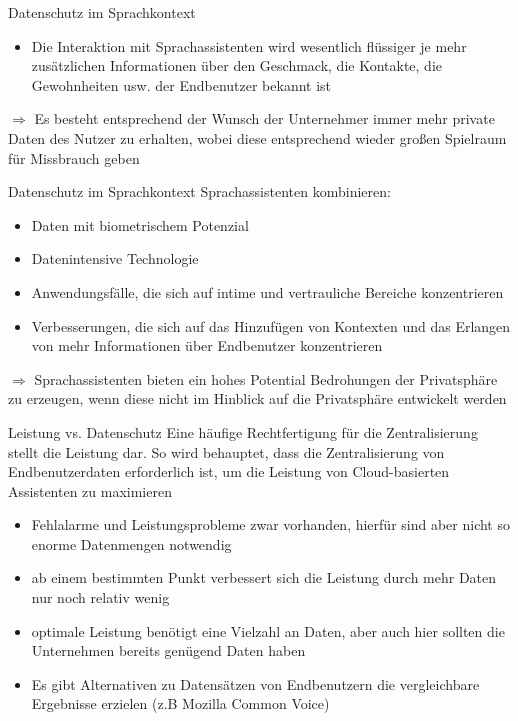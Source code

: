 \documentclass[aspectratio=169]{beamer}
\begin{document}
\begin{frame}{Datenschutz im Sprachkontext}
	\begin{itemize} 
		\item Die Interaktion mit Sprachassistenten wird wesentlich flüssiger je mehr zusätzlichen Informationen über den Geschmack, die Kontakte, die Gewohnheiten usw. der Endbenutzer bekannt ist
	\end{itemize}
    $\Rightarrow$ Es besteht entsprechend der Wunsch der Unternehmer immer mehr private Daten des Nutzer zu erhalten, wobei diese entsprechend wieder großen Spielraum für Missbrauch geben
\end{frame}


\begin{frame}{Datenschutz im Sprachkontext}
	Sprachassistenten kombinieren:
	\begin{itemize} 
		\item Daten mit biometrischem Potenzial
		\item Datenintensive Technologie
		\item Anwendungsfälle, die sich auf intime und vertrauliche Bereiche konzentrieren
		\item Verbesserungen, die sich auf das Hinzufügen von Kontexten und das Erlangen von mehr Informationen über Endbenutzer konzentrieren
	\end{itemize}
     $\Rightarrow$ Sprachassistenten bieten ein hohes Potential Bedrohungen der Privatsphäre zu erzeugen, wenn diese nicht im Hinblick auf die Privatsphäre entwickelt werden
\end{frame}


\begin{frame}{Leistung vs. Datenschutz}
	Eine häufige Rechtfertigung für die Zentralisierung stellt die Leistung dar. So wird behauptet, dass die Zentralisierung von Endbenutzerdaten erforderlich ist, um die Leistung von Cloud-basierten Assistenten zu maximieren
	\begin{itemize} 
		\item Fehlalarme und Leistungsprobleme zwar vorhanden, hierfür sind aber nicht so enorme Datenmengen notwendig
		\item ab einem bestimmten Punkt verbessert sich die Leistung durch mehr Daten nur noch relativ wenig
		\item optimale Leistung benötigt eine Vielzahl an Daten, aber auch hier sollten die Unternehmen bereits genügend Daten haben
		\item Es gibt Alternativen zu Datensätzen von Endbenutzern die vergleichbare Ergebnisse erzielen (z.B Mozilla Common Voice)
	\end{itemize}
\end{frame}
\end{document}
